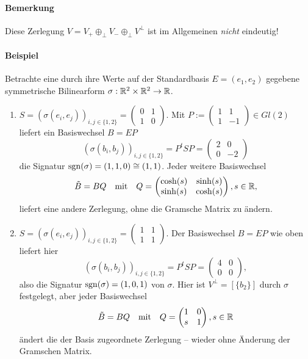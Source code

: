 \paragraph{Bemerkung}
	Diese Zerlegung $ V= V_+ \oplus_\perp V_- \oplus_\perp V^\perp $ ist im Allgemeinen \emph{nicht} eindeutig!
\paragraph{Beispiel}
	Betrachte eine durch ihre Werte auf der Standardbasis $ E=(e_1,e_2) $ gegebene symmetrische Bilinearform $ \sigma: \mathbb{R}^2\times \mathbb{R}^2 \to \mathbb{R} $.
		\begin{enumerate}
			\item $ S=(\sigma(e_i,e_j))_{i,j\in \{1,2\}} =
			\begin{pmatrix}
				0&1\\1& 0
			\end{pmatrix} $. Mit $ P:=\begin{pmatrix}
			1&1\\ 1& -1
			\end{pmatrix}\in Gl(2) $ liefert ein Basiswechsel $ B=EP $
				\[ (\sigma(b_i,b_j))_{i,j\in \{1,2\}} = P^tSP = \begin{pmatrix}
				2 & 0 \\ 0 & -2
				\end{pmatrix} \]
			die Signatur $ \operatorname{sgn}(\sigma) = (1,1,0)\cong (1,1) $.
			Jeder weitere Basiswechsel
				\[ \tilde{B}=BQ \quad\text{mit}\quad Q = \begin{pmatrix}
				\cosh(s) & \sinh(s)\\ \sinh(s)& \cosh(s) 
				\end{pmatrix}, s\in \mathbb{R}, \]
			liefert eine andere Zerlegung, ohne die Gramsche Matrix zu ändern.
			\item $ S=(\sigma(e_i,e_j))_{i,j\in \{1,2\}}= \begin{pmatrix}
			1 & 1\\ 1 & 1
			\end{pmatrix}. $ Der Basiswechsel $ B=EP $ wie oben liefert hier
				\[ (\sigma(b_i,b_j))_{i,j\in \{1,2\}} = P^tSP = \begin{pmatrix}
				4 & 0 \\ 0 & 0
				\end{pmatrix}, \]
			also die Signatur $ \operatorname{sgn}(\sigma) = (1,0,1) $ von $ \sigma $. Hier ist $ V^\perp = [\{b_2\}]$ durch $ \sigma $ festgelegt, aber jeder Basiswechsel
				\[ \tilde{B} = BQ \quad\text{mit}\quad Q= \begin{pmatrix}
				1 & 0 \\ s & 1
				\end{pmatrix}, s\in \mathbb{R} \]
			ändert die der Basis zugeordnete Zerlegung -- wieder ohne Änderung der Gramschen Matrix.
		\end{enumerate}

